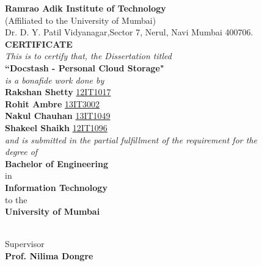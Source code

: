 \begin{center}
\begin{figure*}[h]
\centerline{}
\end{figure*}
{\huge \bf Ramrao Adik Institute of Technology}\\
{\normalsize(Affiliated to the University of Mumbai)}\\
{\normalsize Dr. D. Y. Patil Vidyanagar,Sector 7, Nerul, Navi Mumbai 400706.}\\
\vspace{0.2in}
{\LARGE \bf {CERTIFICATE}}\\
\vspace{0.2in}
{\large\it This is to certify that, the Dissertation titled}\\
\vspace{0.1in}
{\Large \bf ``Docstash - Personal Cloud Storage"}\\
\vspace{0.1in}
{\large \it is a bonafide work done by}\\
\vspace{0.2in}
{\large \bf Rakshan Shetty} \underline{12IT1017}\\
{\large \bf Rohit Ambre} \underline{13IT3002}\\
{\large \bf Nakul Chauhan} \underline{13IT1049}\\
{\large \bf Shakeel Shaikh} \underline{12IT1096}\\
\vspace{0.1in}
{\large \it and is submitted in the partial fulfillment of the requirement for the}\\
{\large \it degree of}\\
\vspace{0.1in}
{\large \bf {Bachelor of Engineering}}\\
\vspace{-0.1in}
{\large in} \\
\vspace{-0.1in}
{\large \bf {Information Technology}}\\
\vspace{-0.1in}
{\large to the} \\
\vspace{-0.1in}
{\large \bf University of Mumbai}\\
\begin{figure*}[h]
\centerline{}
\end{figure*}
\underline{\hspace{4cm}}\\
{\normalsize Supervisor}\\
{\large\bf Prof. Nilima Dongre}\\
\end{center}
